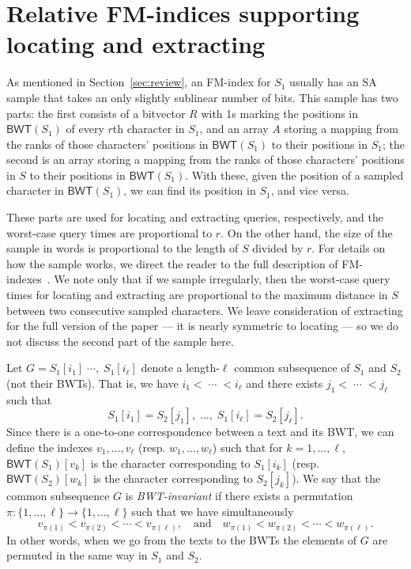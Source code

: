 \documentclass{llncs}
\newcommand{\BWT}
  {\ensuremath{\mathsf{BWT}}}
\begin{document}
\section{Relative FM-indices supporting locating and extracting}
\label{sec:djamal&giovanni}


As mentioned in Section~\ref{sec:review}, an FM-index for $S_1$ usually has
an SA sample that takes an only slightly sublinear number of bits.  This
sample has two parts: the first consists of a bitvector $R$ with 1s marking
the positions in \(\BWT (S_1)\) of every $r$th character in $S_1$, and an
array $A$ storing a mapping from the ranks of those characters' positions in
\(\BWT (S_1)\) to their positions in $S_1$; the second is an array storing a
mapping from the ranks of those characters' positions in $S$ to their
positions in \(\BWT (S_1)\).  With these, given the position of a sampled
character in \(\BWT (S_1)\), we can find its position in $S_1$, and vice
versa.

These parts are used for locating and extracting queries, respectively, and
the worst-case query times are proportional to $r$.  On the other hand, the
size of the sample in words is proportional to the length of $S$ divided by
$r$.  For details on how the sample works, we direct the reader to the full
description of FM-indexes~\cite{FM05}.  We note only that if we sample
irregularly, then the worst-case query times for locating and extracting are
proportional to the maximum distance in $S$ between two consecutive sampled
characters.  We leave consideration of extracting for the full version of the
paper --- it is nearly symmetric to locating --- so we do not discuss the
second part of the sample here.

Let
\(G = S_1[i_1]\;\cdots,\;S_1[i_\ell]\)
denote a length-$\ell$ common subsequence of $S_1$ and $S_2$ (not their
BWTs). That is, we have $i_1< \;\cdots\; < i_\ell$ and there exists $j_1 <
\;\cdots\; < j_\ell$ such that
$$
S_1[i_1]=S_2[j_1],\;\ldots,\;S_1[i_\ell]=S_2[j_\ell].
$$
Since there is a one-to-one correspondence between a text and its BWT, we can
define the indexes $v_1, \ldots, v_\ell$ (resp. $w_1,\ldots,w_\ell$) such
that for $k=1,\ldots,\ell$, $\BWT(S_1)[v_k]$ is the character corresponding
to $S_1[i_k]$ (resp. $\BWT(S_2)[w_k]$ is the character corresponding to
$S_2[j_k]$). We say that the common subsequence $G$ is {\em BWT-invariant} if
there exists a permutation $\pi: \{1,\ldots,\ell\} \rightarrow
\{1,\ldots,\ell\}$ such that we have simultaneously
\begin{equation}\label{eq:bwtinv}
v_{\pi(1)} < v_{\pi(2)} < \cdots < v_{\pi(\ell)}, \quad\mbox{and}\quad
w_{\pi(1)} < w_{\pi(2)} < \cdots < w_{\pi(\ell)}.
\end{equation}
In other words, when we go from the texts to the BWTs the elements of $G$ are
permuted in the same way in $S_1$ and $S_2$.
\end{document}
